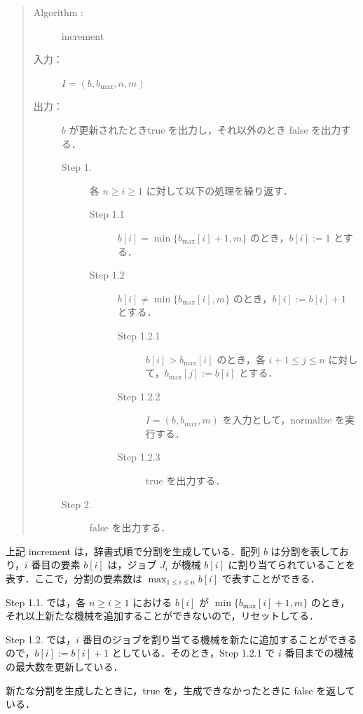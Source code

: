 \documentclass[12pt]{optlab-bachelor}
\begin{document}
\begin{quote}
  \begin{description}
    \item[{\sc Algorithm : }]  {\sc increment}
    \item[入力：] $I = (b,b_{\max},n, m)$
    \item[出力：] $b$ が更新されたとき{\sc true} を出力し，それ以外のとき {\sc false} を出力する．
    \begin{description}
      \item[Step 1.] 各 $n \ge i \ge 1$ に対して以下の処理を繰り返す．
      \begin{description}
        \item[Step 1.1] $b[i] = \min\{b_{\max}[i] + 1, m\}$ のとき，$b[i] := 1$ とする．
        \item[Step 1.2] $b[i] \neq \min\{b_{\max}[i], m\}$ のとき，$b[i] := b[i] + 1$ とする．
        \begin{description}
          \item[Step 1.2.1] $b[i] > b_{\max}[i]$ のとき，各 $i + 1 \le j \le n$ に対して，$b_{\max}[j] := b[i]$ とする．
          \item[Step 1.2.2] $I = (b,b_{\max},m)$ を入力として，{\sc normalize} を実行する．
          \item[Step 1.2.3] {\sc true} を出力する．
        \end{description}
      \end{description}
      \item[Step 2.] {\sc false} を出力する．
    \end{description}
  \end{description}
\end{quote}

上記 {\sc increment} は，辞書式順で分割を生成している．配列 $b$ は分割を表しており，$i$ 番目の要素 $b[i]$ は，ジョブ $J_i$ が機械 $b[i]$ に割り当てられていることを表す．ここで，分割の要素数は $\displaystyle \max_{1 \le i \le n}b[i]$ で表すことができる．

Step 1.1. では，各 $n \ge i \ge 1$ における $b[i]$ が $\min\{b_{\max}[i] + 1, m\}$ のとき，それ以上新たな機械を追加することができないので，リセットしてる．

Step 1.2. では，$i$ 番目のジョブを割り当てる機械を新たに追加することができるので，$b[i] := b[i] + 1$ としている．そのとき，Step 1.2.1 で $i$ 番目までの機械の最大数を更新している．

新たな分割を生成したときに，{\sc true} を，生成できなかったときに {\sc false} を返している．
\end{document}
